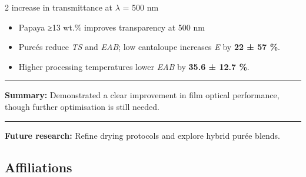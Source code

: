 \documentclass[
]{ImperialPoster}
\begin{document}
\begin{multicols}{2}
	 increase in transmittance at \(\lambda\) = 500 nm
    
	  \begin{itemize}
      \item Papaya ≥13 wt.\% improves transparency at 500 nm
      \item Pure\'{e}s reduce \textit{TS} and \textit{EAB}; low cantaloupe increases \textit{E} by \textbf{22 ± 57 \%}.
      \item Higher processing temperatures lower \textit{EAB} by \textbf{35.6 ± 12.7 \%}.

    \end{itemize}

\vspace{-1.2\baselineskip}

\begin{center}
  \textcolor{ICLBlue}{\rule{\linewidth}{0.2pt}} %
  \vspace{1mm}
  \textcolor{ICLBlue}{\textbf{Summary:}} Demonstrated a clear improvement in film optical performance, though further optimisation is still needed.
  \vspace{1mm}
  \textcolor{ICLBlue}{\rule{\linewidth}{0.2pt}} %
\end{center}



\vspace{-1.2\baselineskip}
\textbf{\textcolor{ICLBlue}{ Future research:}}  Refine drying protocols and explore hybrid pur\'{e}e blends.
  
	
	
	\subsection{Affiliations}
	
	\\
    \hspace{1mm}

\vspace{-1.2\baselineskip}

\end{multicols}
\end{document}
